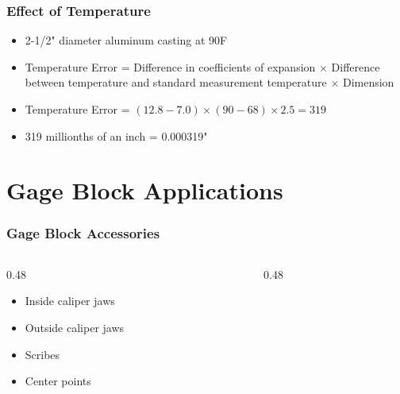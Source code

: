 \begin{frame}
	\frametitle{Effect of Temperature}

    \begin{itemize}[<+- | alert@+>]
        \item 2-1/2" diameter aluminum casting at 90\textdegree F
        \item Temperature Error = Difference in coefficients of expansion $\times$ Difference between temperature and standard measurement temperature $\times$ Dimension
        \item Temperature Error = $(12.8-7.0)\times (90-68) \times 2.5 = 319$
        \item 319 millionths of an inch = 0.000319"
    \end{itemize}
\end{frame}

\section{Gage Block Applications}
            
\begin{frame}
	\frametitle{Gage Block Accessories}

    \begin{columns}
        \begin{column}{0.48\linewidth}
            \begin{itemize}[<+- | alert@+>]
                \item Inside caliper jaws
                \item Outside caliper jaws
                \item Scribes 
                \item Center points
            \end{itemize}
        \end{column}
        \begin{column}{0.48\linewidth}
        \end{column}
    \end{columns}
\end{frame}


